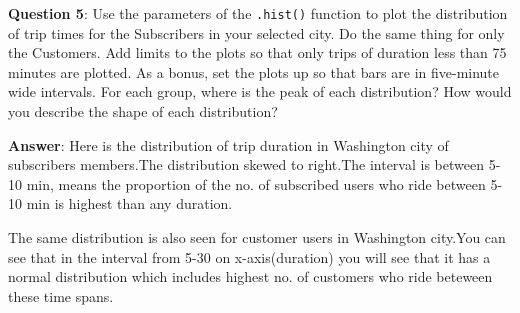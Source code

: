 \documentclass[11pt]{article}
\begin{document}
\textbf{Question 5}: Use the parameters of the \texttt{.hist()} function
to plot the distribution of trip times for the Subscribers in your
selected city. Do the same thing for only the Customers. Add limits to
the plots so that only trips of duration less than 75 minutes are
plotted. As a bonus, set the plots up so that bars are in five-minute
wide intervals. For each group, where is the peak of each distribution?
How would you describe the shape of each distribution?

\textbf{Answer}: Here is the distribution of trip duration in Washington
city of subscribers members.The distribution skewed to right.The
interval is between 5-10 min, means the proportion of the no. of
subscribed users who ride between 5-10 min is highest than any duration.

The same distribution is also seen for customer users in Washington
city.You can see that in the interval from 5-30 on x-axis(duration) you
will see that it has a normal distribution which includes highest no. of
customers who ride beteween these time spans.
\end{document}
